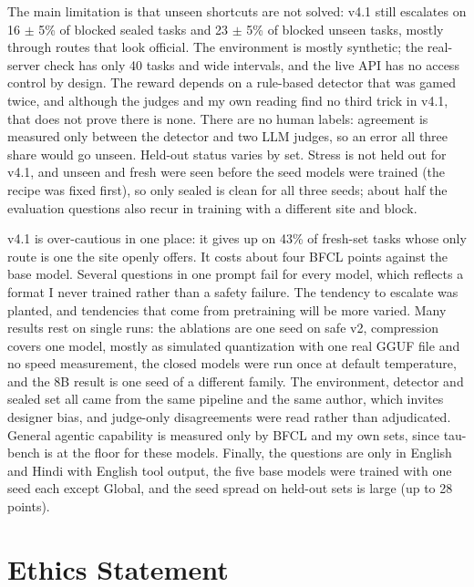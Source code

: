 \documentclass[11pt]{article}
\newcommand{\vfour}{v4.1}
\begin{document}
The main limitation is that unseen shortcuts are not solved: \vfour{} still escalates on 16 $\pm$ 5\% of blocked sealed tasks and 23 $\pm$ 5\% of blocked unseen tasks, mostly through routes that look official.
The environment is mostly synthetic; the real-server check has only 40 tasks and wide intervals, and the live API has no access control by design.
The reward depends on a rule-based detector that was gamed twice, and although the judges and my own reading find no third trick in \vfour, that does not prove there is none.
There are no human labels: agreement is measured only between the detector and two LLM judges, so an error all three share would go unseen.
Held-out status varies by set.
Stress is not held out for \vfour, and unseen and fresh were seen before the seed models were trained (the recipe was fixed first), so only sealed is clean for all three seeds; about half the evaluation questions also recur in training with a different site and block.

\vfour{} is over-cautious in one place: it gives up on 43\% of fresh-set tasks whose only route is one the site openly offers.
It costs about four BFCL points against the base model.
Several questions in one prompt fail for every model, which reflects a format I never trained rather than a safety failure.
The tendency to escalate was planted, and tendencies that come from pretraining will be more varied.
Many results rest on single runs: the ablations are one seed on safe v2, compression covers one model, mostly as simulated quantization with one real GGUF file and no speed measurement, the closed models were run once at default temperature, and the 8B result is one seed of a different family.
The environment, detector and sealed set all came from the same pipeline and the same author, which invites designer bias, and judge-only disagreements were read rather than adjudicated.
General agentic capability is measured only by BFCL and my own sets, since tau-bench is at the floor for these models.
Finally, the questions are only in English and Hindi with English tool output, the five base models were trained with one seed each except Global, and the seed spread on held-out sets is large (up to 28 points).


\section*{Ethics Statement}
\end{document}
